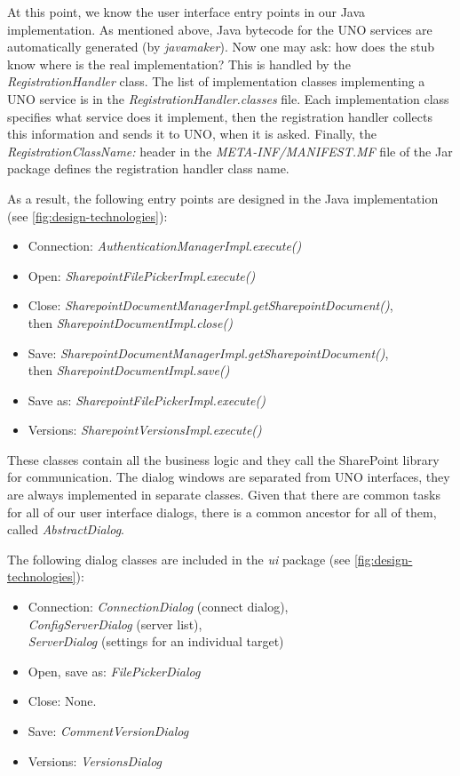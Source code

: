 At this point, we know the user interface entry points in our Java
implementation. As mentioned above, Java bytecode for the UNO services are
automatically generated (by \emph{javamaker}). Now one may ask: how does the
stub know where is the real implementation? This is handled by the
\emph{RegistrationHandler} class. The list of implementation classes
implementing a UNO service is in the \emph{RegistrationHandler.classes} file.
Each implementation class specifies what service does it implement, then the
registration handler collects this information and sends it to UNO, when it is
asked. Finally, the \emph{RegistrationClassName:} header in the
\emph{META-INF/MANIFEST.MF} file of the Jar package defines the registration
handler class name.

As a result, the following entry points are designed in the Java
implementation (see \autoref{fig:design-technologies}):

\begin{itemize}
\item Connection: \emph{AuthenticationManagerImpl.execute()}
\item Open: \emph{SharepointFilePickerImpl.execute()}
\item Close: \emph{SharepointDocumentManagerImpl.getSharepointDocument()}, \\ then \emph{SharepointDocumentImpl.close()}
\item Save: \emph{SharepointDocumentManagerImpl.getSharepointDocument()}, \\ then \emph{SharepointDocumentImpl.save()}
\item Save as: \emph{SharepointFilePickerImpl.execute()}
\item Versions: \emph{SharepointVersionsImpl.execute()}
\end{itemize}

These classes contain all the business logic and they call the SharePoint
library for communication. The dialog windows are separated from UNO
interfaces, they are always implemented in separate classes. Given that there
are common tasks for all of our user interface dialogs, there is a common
ancestor for all of them, called \emph{AbstractDialog}.

The following dialog classes are included in the \emph{ui} package (see \autoref{fig:design-technologies}):

\begin{itemize}
\item Connection: \emph{ConnectionDialog} (connect dialog), \\
\emph{ConfigServerDialog} (server list), \\ \emph{ServerDialog} (settings for an
individual target)
\item Open, save as: \emph{FilePickerDialog}
\item Close: None.
\item Save: \emph{CommentVersionDialog}
\item Versions: \emph{VersionsDialog}
\end{itemize}

